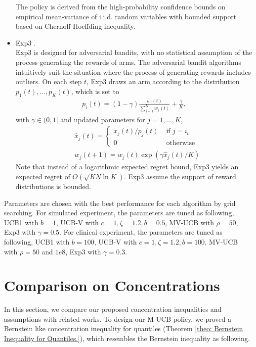 \begin{itemize}
The policy is derived from the high-probability confidence bounds on empirical mean-variance of i.i.d. random variables with bounded support based on Chernoff-Hoeffding inequality.

     \item Exp3 \cite{Auer2003adv}.\\
Exp3 is designed for adversarial bandits, with no statistical assumption of the process generating the rewards of arms. The adversarial bandit algorithms intuitively suit the situation where the process of generating rewards includes outliers. On each step $t$, Exp3 draws an arm according to the distribution $p_{1}(t), \ldots, p_{K}(t)$, which is set to
\begin{align}
    p_{i}(t)=(1-\gamma) \frac{w_{i}(t)}{\sum_{j=1}^{K} w_{j}(t)}+\frac{\gamma}{K},
\end{align}
with $\gamma \in(0,1]$ and updated parameters for $j = 1, ..., K$,
\begin{align*}
    &\hat{x}_{j}(t) =\left\{\begin{array}{cc}{x_{j}(t) / p_{j}(t)} & {\text { if } j=i_{t}} \\ {0} & {\text { otherwise }}\end{array}\right.\\
    & w_{j}(t+1)=w_{j}(t) \exp \left(\gamma \hat{x}_{j}(t) / K\right)
\end{align*}
Note that instead of a logarithmic expected regret bound, Exp3 yields an expected regret of $O(\sqrt{K N \ln K})$. Exp3 assume the support of reward distributions is bounded. 

 \end{itemize}
 
 Parameters are chosen with the best performance for each algorithm by grid searching. 
 For simulated experiment, the parameters are tuned as following, UCB1 with $b = 1$, UCB-V with $c = 1, \zeta = 1.2, b = 0.5$, MV-UCB with $\rho = 50$, Exp3 with $\gamma = 0.5$.
 For clinical experiment, the parameters are tuned as following, UCB1 with $b = 100$, UCB-V with $c = 1, \zeta = 1.2, b = 100$, MV-UCB with $\rho = 50$ and $1e8$, Exp3 with $\gamma = 0.3$.

\section{Comparison on Concentrations}
\label{sec: Comparison with Related Work}

In this section, we compare our proposed concentration inequalities and assumptions with related works.
To design our M-UCB policy, we proved a Bernstein like concentration inequality for quantiles (Theorem \ref{theo: Bernstein Inequality for Quantiles.}), which resembles the Bernstein inequality as following.

